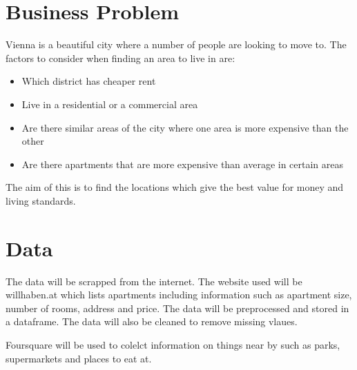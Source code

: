 \documentclass[12pt]{article}
\begin{document}
\maketitle

\section{Business Problem}
Vienna is a beautiful city where a number of people are looking to move to. The factors to consider when finding an area to live in are:

\begin{itemize}
\item Which district has cheaper rent
\item Live in a residential or a commercial area
\item Are there similar areas of the city where one area is more expensive than the other
\item Are there apartments that are more expensive than average in certain areas
\end{itemize}

The aim of this is to find the locations which give the best value for money and living standards.

\section{Data}
The data will be scrapped from the internet. The website used will be willhaben.at which lists apartments including information such as apartment size, number of rooms, address and price. The data will be preprocessed and stored in a dataframe. The data will also be cleaned to remove missing vlaues.

Foursquare will be used to colelct information on things near by such as parks, supermarkets and places to eat at.
\end{document}
